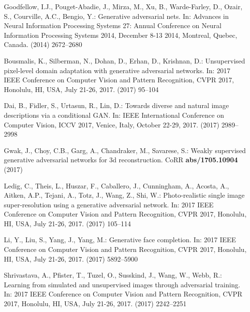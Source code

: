 \documentclass[runningheads]{llncs}
\begin{document}
\begin{thebibliography}{10}

Goodfellow, I.J., Pouget{-}Abadie, J., Mirza, M., Xu, B., Warde{-}Farley, D.,
  Ozair, S., Courville, A.C., Bengio, Y.:
\newblock Generative adversarial nets.
\newblock In: Advances in Neural Information Processing Systems 27: Annual
  Conference on Neural Information Processing Systems 2014, December 8-13 2014,
  Montreal, Quebec, Canada. (2014)  2672--2680

Bousmalis, K., Silberman, N., Dohan, D., Erhan, D., Krishnan, D.:
\newblock Unsupervised pixel-level domain adaptation with generative
  adversarial networks.
\newblock In: 2017 {IEEE} Conference on Computer Vision and Pattern
  Recognition, {CVPR} 2017, Honolulu, HI, USA, July 21-26, 2017. (2017)
  95--104

Dai, B., Fidler, S., Urtasun, R., Lin, D.:
\newblock Towards diverse and natural image descriptions via a conditional
  {GAN}.
\newblock In: {IEEE} International Conference on Computer Vision, {ICCV} 2017,
  Venice, Italy, October 22-29, 2017. (2017)  2989--2998

Gwak, J., Choy, C.B., Garg, A., Chandraker, M., Savarese, S.:
\newblock Weakly supervised generative adversarial networks for 3d
  reconstruction.
\newblock CoRR \textbf{abs/1705.10904} (2017)

Ledig, C., Theis, L., Huszar, F., Caballero, J., Cunningham, A., Acosta, A.,
  Aitken, A.P., Tejani, A., Totz, J., Wang, Z., Shi, W.:
\newblock Photo-realistic single image super-resolution using a generative
  adversarial network.
\newblock In: 2017 {IEEE} Conference on Computer Vision and Pattern
  Recognition, {CVPR} 2017, Honolulu, HI, USA, July 21-26, 2017. (2017)
  105--114

Li, Y., Liu, S., Yang, J., Yang, M.:
\newblock Generative face completion.
\newblock In: 2017 {IEEE} Conference on Computer Vision and Pattern
  Recognition, {CVPR} 2017, Honolulu, HI, USA, July 21-26, 2017. (2017)
  5892--5900

Shrivastava, A., Pfister, T., Tuzel, O., Susskind, J., Wang, W., Webb, R.:
\newblock Learning from simulated and unsupervised images through adversarial
  training.
\newblock In: 2017 {IEEE} Conference on Computer Vision and Pattern
  Recognition, {CVPR} 2017, Honolulu, HI, USA, July 21-26, 2017. (2017)
  2242--2251


\end{thebibliography}
\end{document}
